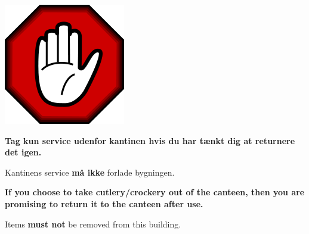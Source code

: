 \documentclass{article}
\begin{document}
\maketitle

\null
\vspace{-0.4cm}

\begin{center}

\includegraphics{billeder/200pxHandWikiCommons.png}

\vspace{1.3cm}

{\fontsize{32}{35}\selectfont\textbf{Tag kun service udenfor kantinen hvis du
har tænkt dig at returnere det igen.}}

\huge

Kantinens service \textbf{må ikke} forlade bygningen.

\english

\vspace{1.3cm}

\textbf{If you choose to take cutlery/crockery out of the canteen, then you are
promising to return it to the canteen after use.}

Items \textbf{must not} be removed from this building. 

\end{center}

\dansk

\underskriv
\end{document}
